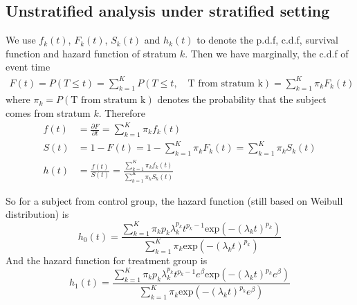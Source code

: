 \documentclass[a4paper,12pt]{article}
\begin{document}
\subsection{Unstratified analysis under stratified setting}
\label{sec:unstr-analys-under}

We use $f_k\left(t\right)$, $F_k\left(t\right)$, $S_k\left(t\right)$ and $h_k\left(t\right)$ to denote the p.d.f, c.d.f, survival function and hazard function of stratum $k$. Then we have marginally, the c.d.f of event time
\[
  \begin{aligned}
    F\left(t\right) = P\left(T \leq t\right)
    = \sum\limits_{k = 1}^K P\left(T \leq t,\quad \text{T from stratum k}\right)
    = \sum\limits_{k = 1}^K \pi_k F_k\left(t\right)
  \end{aligned}
\]
where $\pi_k = P\left(\text{T from stratum k}\right)$ denotes the probability that the subject comes from stratum $k$. Therefore
\[
  \begin{aligned}
    f\left(t\right)
    &= \frac{\partial F}{\partial t} = \sum\limits_{k = 1}^K\pi_kf_k\left(t\right)    \\
    S\left(t\right)
    &= 1 - F\left(t\right) = 1 - \sum\limits_{k = 1}^K\pi_kF_k\left(t\right)
      = \sum\limits_{k = 1}^K\pi_k S_k\left(t\right)    \\
    h\left(t\right)
    &= \frac{f\left(t\right)}{S\left(t\right)}
      = \frac{\sum\limits_{k = 1}^K\pi_kf_k\left(t\right)}{\sum\limits_{k = 1}^K\pi_k S_k\left(t\right)}
  \end{aligned}
\]

So for a subject from control group, the hazard function (still based on Weibull distribution) is
\begin{equation}
  \label{eq:control_marginal_hazard}
  h_0\left(t\right) =
  \frac{
    \sum\limits_{k = 1}^K\pi_k
    p_k\lambda_k^{p_k}t^{p_k - 1}
    \mathrm{exp}\left(-\left(\lambda_kt\right)^{p_k}\right)
  }{
    \sum\limits_{k = 1}^K\pi_k
    \mathrm{exp}\left(-\left(\lambda_kt\right)^{p_k}\right)
  }
\end{equation}
And the hazard function for treatment group is
\begin{equation}
  \label{eq:treatment_marginal_hazard}
  h_1\left(t\right) =
  \frac{
    \sum\limits_{k = 1}^K\pi_k
    p_k\lambda_k^{p_k}t^{p_k - 1}e^\beta
    \mathrm{exp}\left(-\left(\lambda_kt\right)^{p_k}e^\beta\right)
  }{
    \sum\limits_{k = 1}^K\pi_k
    \mathrm{exp}\left(-\left(\lambda_kt\right)^{p_k}e^\beta\right)
  }
\end{equation}
\end{document}
